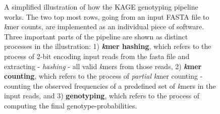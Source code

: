 \begin{figure}[H]
\begin{center}
{\begin{tikzpicture}
\end{tikzpicture}
}
\caption{
  A simplified illustration of how the KAGE genotyping pipeline works.
  The two top most rows, going from an input FASTA file to \textit{k}mer counts, are implemented as an individual piece of software.
  Three important parts of the pipeline are shown as distinct processes in the illustration: 
  1) \textbf{\textit{k}mer hashing}, which refers to the process of 2-bit encoding input reads from the fasta file and extracting - \textit{hashing} - all valid \textit{k}mers from those reads, 
  2) \textbf{\textit{k}mer counting}, which refers to the process of \textit{partial k}mer counting - counting the observed frequencies of a predefined set of \textit{k}mers in the input reads, and 
  3) \textbf{genotyping}, which refers to the process of computing the final genotype-probabilities.
}
\label{background:kage:figures:pipeline}
\end{center}
\end{figure}

